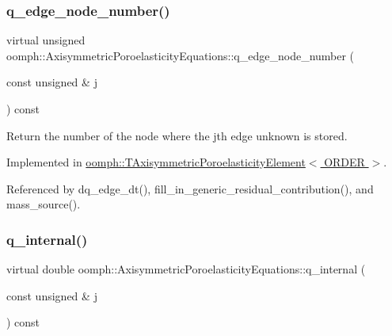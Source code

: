 \mbox{\label{classoomph_1_1AxisymmetricPoroelasticityEquations_a3067ec7af1ffb4656b63f5921a9a6467}} 
\subsubsection{\texorpdfstring{q\+\_\+edge\+\_\+node\+\_\+number()}{q\_edge\_node\_number()}}
{\footnotesize\ttfamily virtual unsigned oomph\+::\+Axisymmetric\+Poroelasticity\+Equations\+::q\+\_\+edge\+\_\+node\+\_\+number (\begin{DoxyParamCaption}\item[{const unsigned \&}]{j }\end{DoxyParamCaption}) const\hspace{0.3cm}{\ttfamily [pure virtual]}}



Return the number of the node where the jth edge unknown is stored. 



Implemented in \hyperlink{classoomph_1_1TAxisymmetricPoroelasticityElement_a6a76ba9fafcb226230340a6d1d931094}{oomph\+::\+T\+Axisymmetric\+Poroelasticity\+Element$<$ O\+R\+D\+E\+R $>$}.



Referenced by dq\+\_\+edge\+\_\+dt(), fill\+\_\+in\+\_\+generic\+\_\+residual\+\_\+contribution(), and mass\+\_\+source().

\mbox{\label{classoomph_1_1AxisymmetricPoroelasticityEquations_aa8e09704efd83dcc29b6d10c7d67fd0a}} 
\subsubsection{\texorpdfstring{q\+\_\+internal()}{q\_internal()}\hspace{0.1cm}{\footnotesize\ttfamily [1/2]}}
{\footnotesize\ttfamily virtual double oomph\+::\+Axisymmetric\+Poroelasticity\+Equations\+::q\+\_\+internal (\begin{DoxyParamCaption}\item[{const unsigned \&}]{j }\end{DoxyParamCaption}) const\hspace{0.3cm}{\ttfamily [pure virtual]}}



